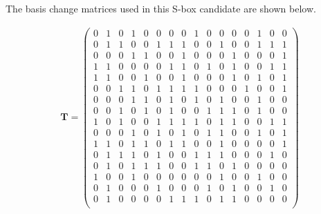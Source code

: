 \newpage 

The basis change matrices used in this S-box candidate are shown below. 

\begin{align*}
\mathbf{T} = 
\begin{pmatrix}
0 &1 &0 &1 &0 &0 &0 &0 &1 &0 &0 &0 &0 &1 &0 &0\\
0 &1 &1 &0 &0 &1 &1 &1 &0 &0 &1 &0 &0 &1 &1 &1\\
0 &0 &0 &1 &1 &0 &0 &1 &0 &0 &0 &1 &0 &0 &0 &1\\
1 &1 &0 &0 &0 &0 &1 &1 &0 &1 &0 &1 &0 &0 &1 &1\\
1 &1 &0 &0 &1 &0 &0 &1 &0 &0 &0 &1 &0 &1 &0 &1\\
0 &0 &1 &1 &0 &1 &1 &1 &1 &0 &0 &0 &1 &0 &0 &1\\
0 &0 &0 &1 &1 &0 &1 &0 &1 &0 &1 &0 &0 &1 &0 &0\\
0 &0 &1 &0 &1 &0 &1 &0 &0 &1 &1 &1 &0 &1 &0 &0\\ 
1 &0 &1 &0 &0 &1 &1 &1 &1 &0 &1 &1 &0 &0 &1 &1\\
0 &0 &0 &1 &0 &1 &0 &1 &0 &1 &1 &0 &0 &1 &0 &1\\
1 &1 &0 &1 &1 &0 &1 &1 &0 &0 &1 &0 &0 &0 &0 &1\\
0 &1 &1 &1 &0 &1 &0 &0 &1 &1 &1 &0 &0 &0 &1 &0\\
0 &1 &0 &1 &1 &1 &0 &0 &1 &1 &0 &1 &0 &0 &0 &0\\
1 &0 &0 &1 &0 &0 &0 &0 &0 &0 &1 &0 &0 &1 &0 &0\\
0 &1 &0 &0 &0 &1 &0 &0 &0 &1 &0 &1 &0 &0 &1 &0\\
0 &1 &0 &0 &0 &0 &1 &1 &1 &0 &1 &1 &0 &0 &0 &0\\
\end{pmatrix}
\end{align*}
